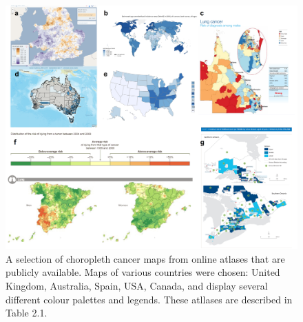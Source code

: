 \documentclass{monashthesis}
\begin{document}
\begin{figure}

{\centering \includegraphics[width=1\linewidth]{figures/02-literature/choropleth_grid} 

}

\caption{ A selection of choropleth cancer maps from online atlases that are publicly available. Maps of various countries were chosen: United Kingdom, Australia, Spain, USA, Canada, and display several different colour palettes and legends. These atllases are described in Table 2.1.}\label{fig:choropleth-grid-create}
\end{figure}

\newpage
\end{document}
